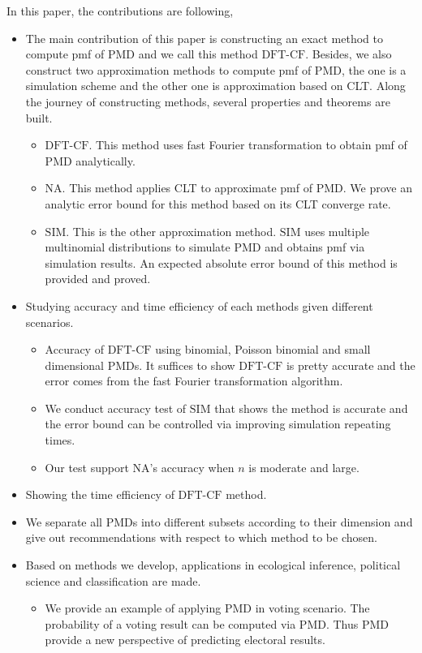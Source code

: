 \documentclass[12pt]{article}
\newcommand{\PMD}{\textrm{PMD}}
\newcommand{\SIM}{{\textrm{SIM}}}
\newcommand{\NA}{{\textrm{NA}}}
\newcommand{\dft}{{\textrm{DFT-CF}}}
\begin{document}
In this paper, the contributions are following,
\begin{itemize}
	\item The main contribution of this paper is constructing an exact method to compute pmf of $\PMD$ and we call this method $\dft$. Besides, we also construct two approximation methods to compute pmf of $\PMD$, the one is a simulation scheme and the other one is approximation based on CLT. Along the journey of constructing methods, several properties and theorems are built.
	\begin{itemize}
		\item $\dft$. This method uses fast Fourier transformation to obtain pmf of $\PMD$ analytically.
		\item $\NA$. This method applies CLT to approximate pmf of $\PMD$. We prove an analytic error bound for this method based on its CLT converge rate.
		\item $\SIM$. This is the other approximation method. $\SIM$ uses multiple multinomial distributions to simulate $\PMD$ and obtains pmf via simulation results. An expected absolute error bound of this method is provided and proved.
	\end{itemize}
	\item Studying accuracy and time efficiency of each methods given different scenarios.
	\begin{itemize}
		\item Accuracy of $\dft$ using binomial, Poisson binomial and small dimensional $\PMD$s. It suffices to show $\dft$ is pretty accurate and the error comes from the fast Fourier transformation algorithm.
		\item We conduct accuracy test of $\SIM$ that shows the method is accurate and the error bound can be controlled via improving simulation repeating times.
		\item Our test support $\NA$'s accuracy when $n$ is moderate and large.
	\end{itemize}
	\item Showing the time efficiency of $\dft$ method.
	\item We separate all $\PMD$s into different subsets according to their dimension and give out recommendations with respect to which method to be chosen.
	\item Based on methods we develop, applications in ecological inference, political science and classification are made.
	\begin{itemize}
		\item We provide an example of applying $\PMD$ in voting scenario. The probability of a voting result can be computed via $\PMD$. Thus $\PMD$ provide a new perspective of predicting electoral results.

\end{itemize}
\end{itemize}
\end{document}
